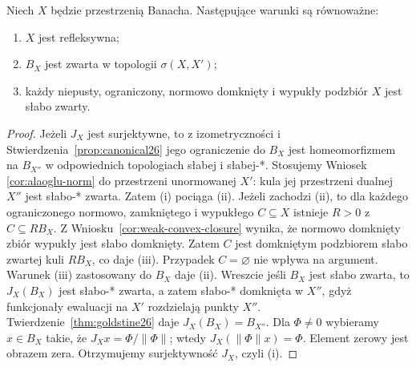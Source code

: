 \begin{twierdzenie}
\label{thm:reflexive-ball26}
Niech $X$ będzie przestrzenią Banacha. Następujące warunki
są równoważne:
\begin{enumerate}[label=\textup{(\roman*)}]
\item $X$ jest refleksywna;
\item $B_X$ jest zwarta w topologii $\sigma(X,X')$;
\item każdy niepusty, ograniczony, normowo domknięty i wypukły
podzbiór $X$ jest słabo zwarty.
\end{enumerate}
\end{twierdzenie}
\begin{proof}
Jeżeli $J_X$ jest surjektywne, to z izometryczności i
Stwierdzenia~\ref{prop:canonical26} jego ograniczenie
do $B_X$ jest homeomorfizmem na $B_{X''}$ w odpowiednich
topologiach słabej i słabej-*. Stosujemy Wniosek~
\ref{cor:alaoglu-norm} do przestrzeni unormowanej $X'$:
kula jej przestrzeni dualnej $X''$ jest słabo-* zwarta.
Zatem (i) pociąga (ii).
Jeżeli zachodzi (ii), to dla każdego ograniczonego normowo,
zamkniętego i wypukłego $C\subseteq X$ istnieje $R>0$ z
$C\subseteq RB_X$. Z Wniosku~\ref{cor:weak-convex-closure} wynika, że
normowo domknięty zbiór wypukły jest słabo domknięty.
Zatem $C$ jest domkniętym podzbiorem słabo zwartej kuli $RB_X$,
co daje (iii). Przypadek $C=\varnothing$ nie wpływa na argument.
Warunek (iii) zastosowany do $B_X$ daje (ii).
Wreszcie jeśli $B_X$ jest słabo zwarta, to $J_X(B_X)$ jest
słabo-* zwarta, a zatem słabo-* domknięta w $X''$,
gdyż funkcjonały ewaluacji na $X'$ rozdzielają punkty
$X''$. Twierdzenie~\ref{thm:goldstine26} daje
$J_X(B_X)=B_{X''}$. Dla $\Phi\ne0$ wybieramy
$x\in B_X$ takie, że $J_Xx=\Phi/\|\Phi\|$; wtedy
$J_X(\|\Phi\|x)=\Phi$. Element zerowy jest obrazem zera.
Otrzymujemy surjektywność $J_X$, czyli (i).
\end{proof}

